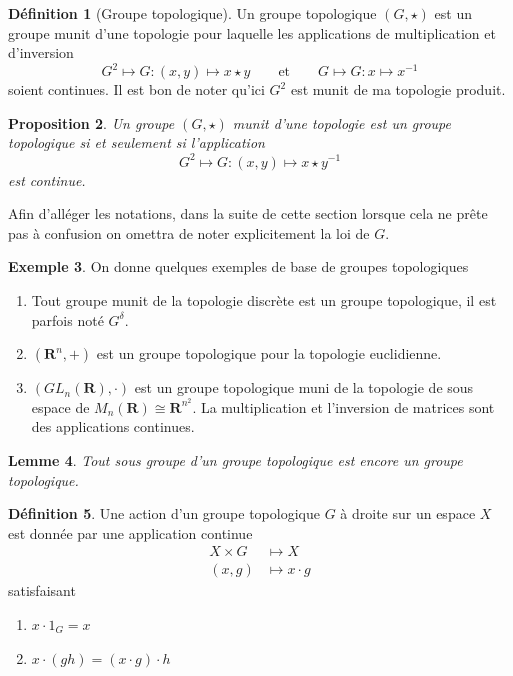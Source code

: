 \documentclass[12pt]{book}
\newtheorem{lemma}{Lemme}[section]
\newtheorem{prop}[lemma]{Proposition}
\theoremstyle{definition}
\newtheorem{definition}[lemma]{Définition}
\newtheorem{example}[lemma]{Exemple}
\theoremstyle{remark}
\begin{document}
	\begin{definition}[Groupe topologique]
		Un groupe topologique $(G,\star)$ est un groupe munit d'une topologie pour laquelle les applications de multiplication et d'inversion \[
			G^2 \longmapsto G : (x,y) \longmapsto x \star y \qquad \text{et} \qquad G \longmapsto G : x \longmapsto x^{-1}
		\] soient continues. Il est bon de noter qu'ici $G^2$ est munit de ma topologie produit. 
	\end{definition}

	\begin{prop}
		Un groupe $(G,\star)$ munit d'une topologie est un groupe topologique si et seulement si l'application  \[
			G^2 \longmapsto G : (x,y) \longmapsto x \star y^{-1}
		\] est continue. 
	\end{prop}
	Afin d'alléger les notations, dans la suite de cette section lorsque cela ne prête pas à confusion on omettra de noter explicitement la loi de $G$. 

	\begin{example} On donne quelques exemples de base de groupes topologiques
		\begin{enumerate}
			\item Tout groupe munit de la topologie discrète est un groupe topologique, il est parfois noté $G^{\delta}$.
			\item $(\mathbf{R}^n,+)$ est un groupe topologique pour la topologie euclidienne.
			\item $(GL_n(\mathbf{R}),\cdot)$ est un groupe topologique muni de la topologie de sous espace de $M_n(\mathbf{R}) \cong \mathbf{R}^{n^2}$. La multiplication et l'inversion de matrices sont des applications continues. 
		\end{enumerate}	
	\end{example}

	\begin{lemma}
		Tout sous groupe d'un groupe topologique est encore un groupe topologique.
	\end{lemma}

	\begin{definition}
		Une action d'un groupe topologique $G$ à droite sur un espace $X$ est donnée par une application continue
		\begin{align*}
			X \times G &\longmapsto X \\
			(x,g) &\longmapsto x\cdot g
		\end{align*} satisfaisant 

		\begin{enumerate}
			\item $x \cdot 1_G = x$
			\item $x \cdot (gh) = (x \cdot g)\cdot h$
		\end{enumerate}
	\end{definition}
\end{document}

